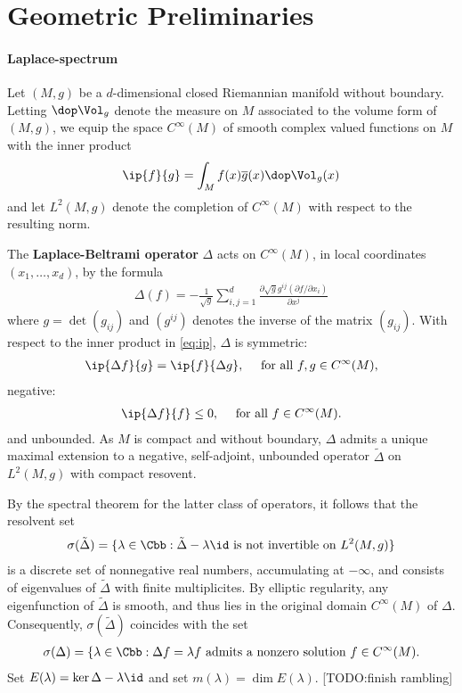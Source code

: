 \section{Geometric Preliminaries}
\paragraph{Laplace-spectrum}
Let $(M,g)$ be a $d$-dimensional closed Riemannian manifold without boundary.  Letting $\dop \Vol_g$ denote the measure on $M$ associated to the volume form of $(M,g)$, we equip the space $C^\infty(M)$ of smooth complex valued functions on $M$ with the inner product
\begin{align}\label{eq:ip}
    \ip{f}{g} = \int_M f(x) \overline{g}(x) \dop \Vol_g(x)
\end{align}
and let $L^2(M,g)$ denote the completion of $C^\infty(M)$ with respect to the resulting norm.

The \textbf{Laplace-Beltrami operator} $\Delta$ acts on $C^\infty(M)$, in local coordinates $(x_1,\dots,x_d)$, by the formula
\begin{align}
    \Delta(f) = -\frac{1}{\sqrt{g}} \sum_{i,j=1}^d \frac{\partial \sqrt{g} g^{ij} (\partial f / \partial x_i)}{\partial x^j}
\end{align}
where $g = \det(g_{ij})$ and $(g^{ij})$ denotes the inverse of the matrix $(g_{ij})$. With respect to the inner product in \ref{eq:ip}, $\Delta$ is symmetric:
\begin{align*}
    \ip{\Delta f}{g} =\ip{ f}{\Delta g}, \quad \text{ for all $f,g \in C^\infty(M)$,}
\end{align*}
negative:
\begin{align*}
    \ip{\Delta f }{f} \leq 0, \quad \text{ for all $f \in C^\infty(M)$.}
\end{align*}
and unbounded. As $M$ is compact and without boundary, $\Delta$ admits a unique maximal extension to a negative, self-adjoint, unbounded operator  $\tilde{\Delta}$ on $L^2(M,g)$ with compact resovent.

By the spectral theorem for the latter class of operators, it follows that the resolvent set
\begin{align*}
    \sigma(\tilde{\Delta}) = \{ \lambda \in \Cbb : \tilde{\Delta} - \lambda \id \text{ is not invertible on $L^2(M,g)$}\}
\end{align*}
is a discrete set of nonnegative real numbers, accumulating at $-\infty$, and consists of eigenvalues of $\tilde{\Delta}$ with finite multiplicites. By elliptic regularity, any eigenfunction of $\tilde{\Delta}$ is smooth, and thus lies in the original domain $C^\infty(M)$ of $\Delta$. Consequently, $\sigma(\tilde{\Delta})$ coincides with the set
\begin{align*}
    \sigma(\Delta) = \{\lambda \in \Cbb : \Delta f  = \lambda f \text{ admits a nonzero  solution  $f \in C^\infty(M)$}.
\end{align*}
Set $E(\lambda) = \ker \Delta - \lambda \id$ and set $m(\lambda) = \dim E(\lambda)$. [TODO:finish rambling]


